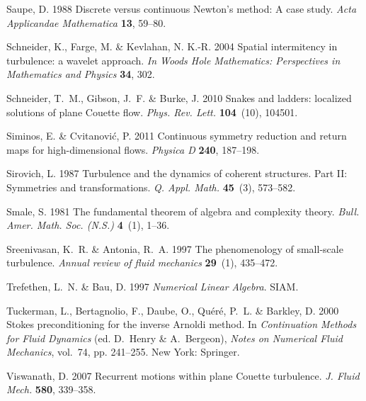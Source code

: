 \documentclass{jfm}
\begin{document}
\begin{thebibliography}{68}
{\sc Saupe, D.} 1988 Discrete versus continuous {N}ewton's method: A case
  study. {\em Acta Applicandae Mathematica\/} {\bf 13}, 59--80.

{\sc Schneider, K., Farge, M. \& Kevlahan, N. K.-R.} 2004 Spatial intermitency
  in turbulence: a wavelet approach. {\em In Woods Hole Mathematics:
  Perspectives in Mathematics and Physics\/} {\bf 34}, 302.

{\sc Schneider, T.~M., Gibson, J.~F. \& Burke, J.} 2010 Snakes and ladders:
  localized solutions of plane {C}ouette flow. {\em Phys. Rev. Lett.\/} {\bf
  104}~(10), 104501.

{\sc Siminos, E. \& Cvitanovi{\'c}, P.} 2011 Continuous symmetry reduction and
  return maps for high-dimensional flows. {\em Physica D\/} {\bf 240},
  187--198.

{\sc Sirovich, L.} 1987 Turbulence and the dynamics of coherent structures.
  {Part II}: {Symmetries} and transformations. {\em Q. Appl. Math.\/} {\bf
  45}~(3), 573--582.

{\sc Smale, S.} 1981 The fundamental theorem of algebra and complexity theory.
  {\em Bull. Amer. Math. Soc. (N.S.)\/} {\bf 4}~(1), 1--36.

{\sc Sreenivasan, K.~R. \& Antonia, R.~A.} 1997 The phenomenology of
  small-scale turbulence. {\em Annual review of fluid mechanics\/} {\bf
  29}~(1), 435--472.

{\sc Trefethen, L.~N. \& Bau, D.} 1997 {\em Numerical Linear Algebra\/}. SIAM.

{\sc Tuckerman, L., Bertagnolio, F., Daube, O., Qu\'er\'e, P.~L. \& Barkley,
  D.} 2000 Stokes preconditioning for the inverse {A}rnoldi method. In {\em
  Continuation Methods for Fluid Dynamics\/} (ed. D.~Henry \& A.~Bergeon), {\em
  Notes on Numerical Fluid Mechanics\/}, vol.~74, pp. 241--255. New York:
  Springer.

{\sc Viswanath, D.} 2007 Recurrent motions within plane {C}ouette turbulence.
  {\em J. Fluid Mech.\/} {\bf 580}, 339--358.


\end{thebibliography}
\end{document}
